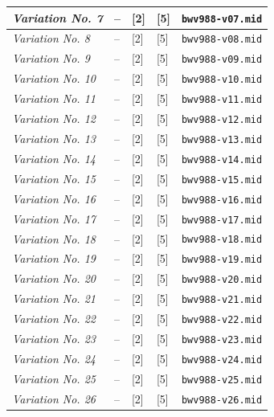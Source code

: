 \documentclass[a4paper, 11pt, twoside]{report}
\theoremstyle{definition}
\begin{document}
\begin{longtable}{ |S{0.37\textwidth}|P{0.12\textwidth}|P{0.09\textwidth}|P{0.09\textwidth}|S{0.21\textwidth}| }
\textit{Variation No. 7}											& --		& [2] 	& [5] 	& \texttt{bwv988-v07.mid} 		\\ \hline
\textit{Variation No. 8}											& --		& [2] 	& [5] 	& \texttt{bwv988-v08.mid} 		\\ \hline
\textit{Variation No. 9}											& --		& [2] 	& [5] 	& \texttt{bwv988-v09.mid} 		\\ \hline
\textit{Variation No. 10}											& --		& [2] 	& [5] 	& \texttt{bwv988-v10.mid} 		\\ \hline
\textit{Variation No. 11}											& --		& [2] 	& [5] 	& \texttt{bwv988-v11.mid} 		\\ \hline
\textit{Variation No. 12}											& --		& [2] 	& [5] 	& \texttt{bwv988-v12.mid} 		\\ \hline
\textit{Variation No. 13}											& --		& [2] 	& [5] 	& \texttt{bwv988-v13.mid} 		\\ \hline
\textit{Variation No. 14}											& --		& [2] 	& [5] 	& \texttt{bwv988-v14.mid} 		\\ \hline
\textit{Variation No. 15}											& --		& [2] 	& [5] 	& \texttt{bwv988-v15.mid} 		\\ \hline
\textit{Variation No. 16}											& --		& [2] 	& [5] 	& \texttt{bwv988-v16.mid} 		\\ \hline
\textit{Variation No. 17}											& --		& [2] 	& [5] 	& \texttt{bwv988-v17.mid} 		\\ \hline
\textit{Variation No. 18}											& --		& [2] 	& [5] 	& \texttt{bwv988-v18.mid} 		\\ \hline
\textit{Variation No. 19}											& --		& [2] 	& [5] 	& \texttt{bwv988-v19.mid} 		\\ \hline
\textit{Variation No. 20}											& --		& [2] 	& [5] 	& \texttt{bwv988-v20.mid} 		\\ \hline
\textit{Variation No. 21}											& --		& [2] 	& [5] 	& \texttt{bwv988-v21.mid} 		\\ \hline
\textit{Variation No. 22}											& --		& [2] 	& [5] 	& \texttt{bwv988-v22.mid} 		\\ \hline
\textit{Variation No. 23}											& --		& [2] 	& [5] 	& \texttt{bwv988-v23.mid} 		\\ \hline
\textit{Variation No. 24}											& --		& [2] 	& [5] 	& \texttt{bwv988-v24.mid} 		\\ \hline
\textit{Variation No. 25}											& --		& [2] 	& [5] 	& \texttt{bwv988-v25.mid} 		\\ \hline
\textit{Variation No. 26}											& --		& [2] 	& [5] 	& \texttt{bwv988-v26.mid} 		\\ \hline

\end{longtable}
\end{document}
